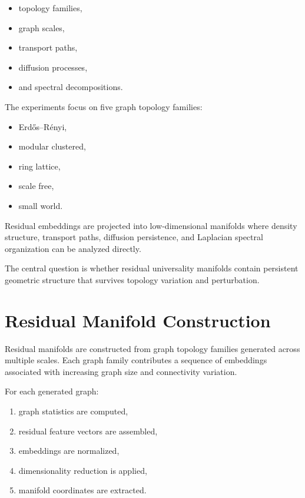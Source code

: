 \documentclass[11pt]{article}
\begin{document}
\begin{itemize}[leftmargin=1.5em]
    \item topology families,
    \item graph scales,
    \item transport paths,
    \item diffusion processes,
    \item and spectral decompositions.
\end{itemize}

The experiments focus on five graph topology families:

\begin{itemize}[leftmargin=1.5em]
    \item Erdős--Rényi,
    \item modular clustered,
    \item ring lattice,
    \item scale free,
    \item small world.
\end{itemize}

Residual embeddings are projected into low-dimensional manifolds where density structure, transport paths, diffusion persistence, and Laplacian spectral organization can be analyzed directly.

The central question is whether residual universality manifolds contain persistent geometric structure that survives topology variation and perturbation.

\section{Residual Manifold Construction}

Residual manifolds are constructed from graph topology families generated across multiple scales. Each graph family contributes a sequence of embeddings associated with increasing graph size and connectivity variation.

For each generated graph:

\begin{enumerate}[leftmargin=1.5em]
    \item graph statistics are computed,
    \item residual feature vectors are assembled,
    \item embeddings are normalized,
    \item dimensionality reduction is applied,
    \item manifold coordinates are extracted.
\end{enumerate}
\end{document}

